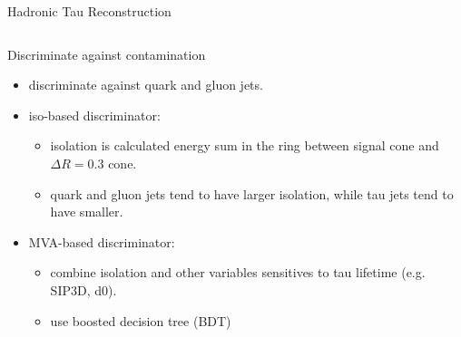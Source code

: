 \begin{frame}{Hadronic Tau Reconstruction}
\smaller
    
    \begin{columns}[c]
        \begin{block}{Discriminate against contamination}
        \begin{itemize} 
            \item discriminate against quark and gluon jets.
            \item iso-based discriminator: 
            \begin{itemize} 
            \smaller
                \item isolation is calculated energy sum in the ring between signal cone and $\Delta R = 0.3$ cone.
                \item quark and gluon jets tend to have larger isolation, while tau jets tend to have smaller.
            \end{itemize}
        
             
            
            \item MVA-based discriminator: 
            \begin{itemize} 
            \smaller
                \item combine isolation and other variables sensitives to tau lifetime (e.g. SIP3D, d0).
                \item use boosted decision tree (BDT)
            \end{itemize}
        \end{itemize}
        \end{block}


\end{columns}
\end{frame}

